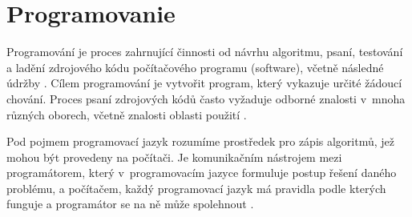 \documentclass[11pt,a4paper]{article}
\begin{document}
	\section{Programovanie}
	
		Programování je proces zahrnující činnosti od návrhu algoritmu, psaní, testování a ladění zdrojového kódu počítačového programu (software), včetně následné údržby \cite{kniha:MacLennan}.
		Cílem programování je vytvořit program, který vykazuje určité žádoucí chování. Proces psaní zdrojových kódů často vyžaduje odborné znalosti v~mnoha různých oborech, včetně znalosti oblasti použití \cite{odkaz:Foundation}.
		
		Pod pojmem programovací jazyk rozumíme prostředek pro zápis algoritmů, jež mohou být provedeny na počítači. Je komunikačním nástrojem mezi programátorem, který v~programovacím jazyce formuluje postup řešení daného problému, a počítačem, každý programovací jazyk má pravidla podle kterých funguje a programátor se na ně může spolehnout \cite{prop:Normy}.
		
	\newpage
	

		
\end{document}
